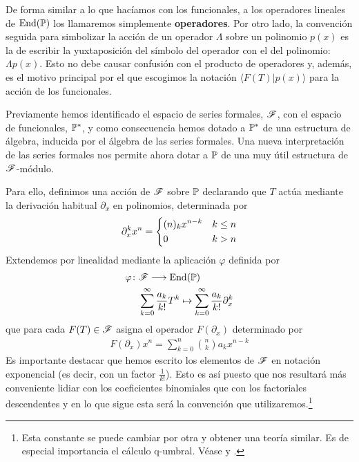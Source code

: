 \begin{obs}
    De forma similar a lo que hacíamos con los funcionales, a los operadores lineales de $\operatorname*{End}(\mathbb{P})$ los llamaremos simplemente \textbf{operadores}. Por otro lado, la convención seguida para simbolizar la acción de un operador $\Lambda$ sobre un polinomio $p(x)$ es la de escribir la yuxtaposición del símbolo del operador con el del polinomio: $\Lambda p(x)$. Esto no debe causar confusión con el producto de operadores y, además, es el motivo principal por el que escogimos la notación $\langle F(T)| p(x)\rangle$ para la acción de los funcionales.
\end{obs}

Previamente hemos identificado el espacio de series formales, $\mathscr{F}$, con el espacio de funcionales, $\mathbb{P}^*$, y como consecuencia hemos dotado a $\mathbb{P}^*$ de una estructura de álgebra, inducida por el álgebra de las series formales. Una nueva interpretación de las series formales nos permite ahora dotar a $\mathbb{P}$ de una muy útil estructura de $\mathscr{F}$-módulo.

Para ello, definimos una acción de $\mathscr{F}$ sobre $\mathbb{P}$ declarando que $T$ actúa mediante la derivación habitual $\partial_{x}$ en polinomios, determinada por
% 
\begin{align}
\label{T como derivada}
	\partial_{x}^k x^n = 
	\begin{dcases}
        (n)_kx^{n-k} & k \leq n
		\\
        0 & k > n
    \end{dcases}
\end{align}
Extendemos por linealidad mediante la aplicación $\varphi$ definida por
\begin{align*}
    \varphi \colon & \mathscr{F} \longrightarrow \operatorname*{End}(\mathbb{P})\\
    & \sum_{k = 0}^\infty \frac{a_k}{k!}T^k \mapsto \sum_{k = 0}^\infty \frac{a_k}{k!}\partial_{x}^k
\end{align*}
que para cada $F(T) \in \mathscr{F}$ asigna el operador $F(\partial_{x})$ determinado por
\begin{align}
\label{accion F(d)xn}
    F(\partial_{x})x^n =\sum_{k = 0}^n \binom{n}{k}a_k x^{n-k}
\end{align}
Es importante destacar que hemos escrito los elementos de $\mathscr{F}$ en notación exponencial (es decir, con un factor $\frac{1}{k!}$). Esto es así puesto que nos resultará más conveniente lidiar con los coeficientes binomiales que con los factoriales descendentes y en lo que sigue esta será la convención que utilizaremos.\footnote{Esta constante se puede cambiar por otra y obtener una teoría similar. Es de especial importancia el cálculo q-umbral. Véase \cite{roman3} y \cite{roman4}.}



